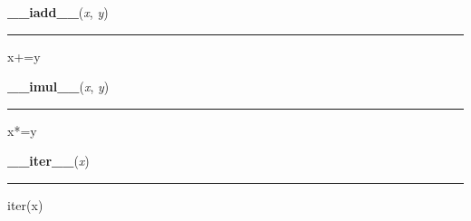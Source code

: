     \label{list:__iadd__}

    \vspace{0.5ex}

    \begin{boxedminipage}{\textwidth}

    \raggedright \textbf{\_\_iadd\_\_}(\textit{x}, \textit{y})

    \vspace{-1.5ex}

    \rule{\textwidth}{0.5\fboxrule}

x+=y
    \vspace{1ex}

    \end{boxedminipage}

    \label{list:__imul__}

    \vspace{0.5ex}

    \begin{boxedminipage}{\textwidth}

    \raggedright \textbf{\_\_imul\_\_}(\textit{x}, \textit{y})

    \vspace{-1.5ex}

    \rule{\textwidth}{0.5\fboxrule}

x*=y
    \vspace{1ex}

    \end{boxedminipage}

    \label{list:__iter__}

    \vspace{0.5ex}

    \begin{boxedminipage}{\textwidth}

    \raggedright \textbf{\_\_iter\_\_}(\textit{x})

    \vspace{-1.5ex}

    \rule{\textwidth}{0.5\fboxrule}

iter(x)
    \vspace{1ex}

    \end{boxedminipage}

    \label{list:__le__}

    \vspace{0.5ex}

